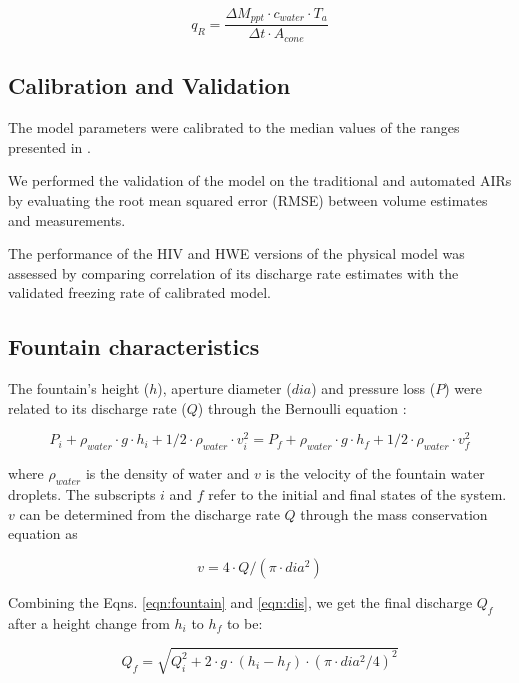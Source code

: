 \documentclass[tc, manuscript]{copernicus}
\begin{document}
\begin{equation}
  q_{R} = \frac{\Delta M_{ppt} \cdot c_{water} \cdot T_{a}}{\Delta t \cdot A_{cone}}
\end{equation}

\subsection{Calibration and Validation}

The model parameters were calibrated to the median values of the ranges presented in
\cite{balasubramanianInfluenceMeteorologicalConditions2022}.

We performed the validation of the model on the traditional and automated AIRs by evaluating the root mean
squared error (RMSE) between volume estimates and measurements. 

The performance of the HIV and HWE versions of the physical model was assessed by comparing correlation of its
discharge rate estimates with the validated freezing rate of calibrated model.

\subsection{Fountain characteristics}

The fountain's height ($h$), aperture diameter ($dia$) and pressure loss ($P$) were related to its discharge
rate ($Q$) through the Bernoulli equation :

\begin{equation}
  \label{eqn:fountain}
  P_{i} + \rho_{water} \cdot g \cdot h_{i} + 1/2 \cdot \rho_{water} \cdot v_{i}^2 = P_{f} + \rho_{water} \cdot g
  \cdot h_{f} + 1/2 \cdot \rho_{water} \cdot v_{f}^2
\end{equation}

where $\rho_{water}$ is the density of water and $v$ is the velocity of the fountain water droplets. The
subscripts $i$ and $f$ refer to the initial and final states of the system. $v$ can be determined from the
discharge rate $Q$ through the mass conservation equation as 

\begin{equation}
	\label{eqn:dis}
 v = 4 \cdot Q/(\pi \cdot dia^2)
\end{equation}

Combining the Eqns. \ref{eqn:fountain} and \ref{eqn:dis}, we get the final discharge $Q_f$ after a height change
from $h_i$ to $h_f$ to be:

\begin{equation}
  \label{eqn:discharge}
  Q_f = \sqrt{Q_i^2 + 2 \cdot g \cdot (h_i-h_f) \cdot (\pi \cdot dia^2/4)^2}
\end{equation}
\end{document}
